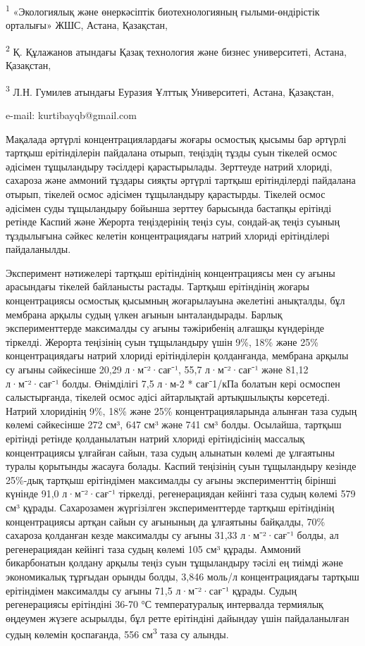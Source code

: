 \begin{affiliation}
\textsuperscript{1} «Экологиялық және өнеркәсіптік биотехнологияның
ғылыми-өндірістік орталығы» ЖШС, Астана, Қазақстан,

\textsuperscript{2} Қ. Құлажанов атындағы Қазақ технология және бизнес
университеті, Астана, Қазақстан,

\textsuperscript{3} Л.Н. Гумилев атындағы Еуразия Ұлттық Университеті,
Астана, Қазақстан,

e-mail: kurtibayqb@gmail.com
\end{affiliation}

Мақалада әртүрлі концентрациялардағы жоғары осмостық қысымы бар әртүрлі
тартқыш ерітінділерін пайдалана отырып, теңіздің тұзды суын тікелей
осмос әдісімен тұщыландыру тәсілдері қарастырылады. Зерттеуде натрий
хлориді, сахароза және аммоний тұздары сияқты әртүрлі тартқыш
ерітінділерді пайдалана отырып, тікелей осмос әдісімен тұщыландыру
қарастырды. Тікелей осмос әдісімен суды тұщыландыру бойынша зерттеу
барысында бастапқы ерітінді ретінде Каспий және Жерорта теңіздерінің
теңіз суы, сондай-ақ теңіз суының тұздылығына сәйкес келетін
концентрациядағы натрий хлориді ерітінділері пайдаланылды.

Эксперимент нәтижелері тартқыш ерітіндінің концентрациясы мен су ағыны
арасындағы тікелей байланысты растады. Тартқыш ерітіндінің жоғары
концентрациясы осмостық қысымның жоғарылауына әкелетіні анықталды, бұл
мембрана арқылы судың үлкен ағынын ынталандырады. Барлық
эксперименттерде максималды су ағыны тәжірибенің алғашқы күндерінде
тіркелді. Жерорта теңізінің суын тұщыландыру үшін 9\%, 18\% және 25\%
концентрациядағы натрий хлориді ерітінділерін қолданғанда, мембрана
арқылы су ағыны сәйкесінше 20,29 л·м⁻²·сағ⁻¹, 55,7 л·м⁻²·сағ⁻¹ және
81,12 л·м⁻²·сағ⁻¹ болды. Өнімділігі 7,5 л·м-2 * сағ⁻1/кПа болатын кері
осмоспен салыстырғанда, тікелей осмос әдісі айтарлықтай артықшылықты
көрсетеді. Натрий хлоридінің 9\%, 18\% және 25\% концентрацияларында
алынған таза судың көлемі сәйкесінше 272 см³, 647 см³ және 741 см³
болды. Осылайша, тартқыш ерітінді ретінде қолданылатын натрий хлориді
ерітіндісінің массалық концентрациясы ұлғайған сайын, таза судың
алынатын көлемі де ұлғаятыны туралы қорытынды жасауға болады. Каспий
теңізінің суын тұщыландыру кезінде 25\%-дық тартқыш ерітіндімен
максималды су ағыны эксперименттің бірінші күнінде 91,0 л·м⁻²·сағ⁻¹
тіркелді, регенерациядан кейінгі таза судың көлемі 579 см³ құрады.
Сахарозамен жүргізілген эксперименттерде тартқыш ерітіндінің
концентрациясы артқан сайын су ағынының да ұлғаятыны байқалды, 70\%
сахароза қолданған кезде максималды су ағыны 31,33 л·м⁻²·сағ⁻¹ болды, ал
регенерациядан кейінгі таза судың көлемі 105 см³ құрады. Аммоний
бикарбонатын қолдану арқылы теңіз суын тұщыландыру тәсілі ең тиімді және
экономикалық тұрғыдан орынды болды, 3,846 моль/л концентрациядағы
тартқыш ерітіндімен максималды су ағыны 71,5 л·м⁻²·сағ⁻¹ құрады. Судың
регенерациясы ерітіндіні 36-70 °С температуралық интервалда термиялық
өңдеумен жүзеге асырылды, бұл ретте ерітіндіні дайындау үшін
пайдаланылған судың көлемін қоспағанда, 556 см\textsuperscript{3} таза
су алынды.

